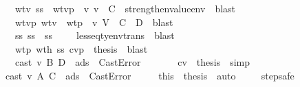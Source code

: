 \begin{isabellebody}
\ \ \ \ \ \ \isamarkupfalse \ wtv{}\ s{}s{}\ \isamarkupfalse \ wtv{}p{\isacharcolon}\ {\isachardoublequoteopen}{\isasymSigma}{}\ {\isasymturnstile}v\ v{}{\isacharprime}\ {\isacharcolon}\ C{\isachardoublequoteclose}\ \isamarkupfalse \ strengthen{\isacharunderscore}value{\isacharunderscore}env\ \isamarkupfalse \ blast\isanewline
\ \ \ \ \ \ \isamarkupfalse \ wtv{}p\ wtv{}\ \isamarkupfalse \ wtp{\isacharcolon}\ {\isachardoublequoteopen}{\isasymSigma}{}\ {\isasymturnstile}v\ {\isacharquery}V\ {\isacharcolon}\ {\isacharparenleft}C\ {\isasymtimes}\ D{\isacharparenright}{\isachardoublequoteclose}\ \isamarkupfalse \ blast\isanewline
\ \ \ \ \ \ \isamarkupfalse \ s{}s\ s{}s{}\ \isamarkupfalse \ s{}s{\isacharcolon}\ {\isachardoublequoteopen}{\isasymSigma}{}\ {\isasymsqsubseteq}\ {\isasymSigma}{\isachardoublequoteclose}\ \isamarkupfalse \ lesseq{\isacharunderscore}tyenv{\isacharunderscore}trans\ \isamarkupfalse \ blast\isanewline
\ \ \ \ \ \ \isamarkupfalse \ wtp\ wth{}\ s{}s\ cvp\ \isamarkupfalse \ {\isacharquery}thesis\ \isamarkupfalse \ blast\isanewline
\ \ \ \ \isamarkupfalse \isanewline
\ \ \ \ \ \ \isamarkupfalse \ {\isachardoublequoteopen}cast\ v{}\ B\ D\ {\isasymmu}{}\ ads{}\ {\isacharequal}\ CastError{\isachardoublequoteclose}\isanewline
\ \ \ \ \ \ \isamarkupfalse \ cv{}\ \isamarkupfalse \ {\isacharquery}thesis\ \isamarkupfalse \ simp\isanewline
\ \ \ \ \isamarkupfalse \isanewline
\ \ \isamarkupfalse \isanewline
\ \ \ \ \isamarkupfalse \ {\isachardoublequoteopen}cast\ v{}\ A\ C\ {\isasymmu}\ ads{}\ {\isacharequal}\ CastError{\isachardoublequoteclose}\isanewline
\ \ \ \ \isamarkupfalse \ this\ \isamarkupfalse \ {\isacharquery}thesis\ \isamarkupfalse \ auto\ \isamarkupfalse \isanewline
\ \ \isamarkupfalse \isanewline
{}\isamarkupfalse \endisatagproof
{\isafoldproof}\isadelimproof
\isanewline
\endisadelimproof
\isanewline
\isanewline
{}\isamarkupfalse \ step{\isacharunderscore}safe{\isacharcolon}\ \isanewline

\end{isabellebody}
